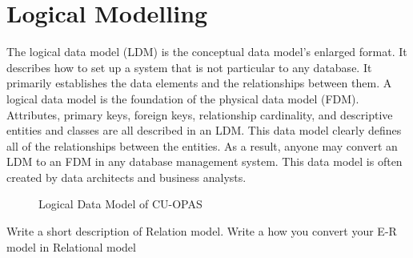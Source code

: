 \section{Logical Modelling}\label{sec:lm}
The logical data model (LDM) is the conceptual data model's enlarged format. It describes how to set up a system that is not particular to any database. It primarily establishes the data elements and the relationships between them. A logical data model is the foundation of the physical data model (FDM). Attributes, primary keys, foreign keys, relationship cardinality, and descriptive entities and classes are all described in an LDM. This data model clearly defines all of the relationships between the entities. As a result, anyone may convert an LDM to an FDM in any database management system. This data model is often created by data architects and business analysts.\\

\begin{figure}[H]
	\captionsetup[subfigure]{labelformat=empty}
	\hfill
	\hfill
	\hfill
	\caption{Logical Data Model of CU-OPAS}
\end{figure}
Write a short description of Relation model. 
Write a how you convert your E-R model in Relational model
\clearpage